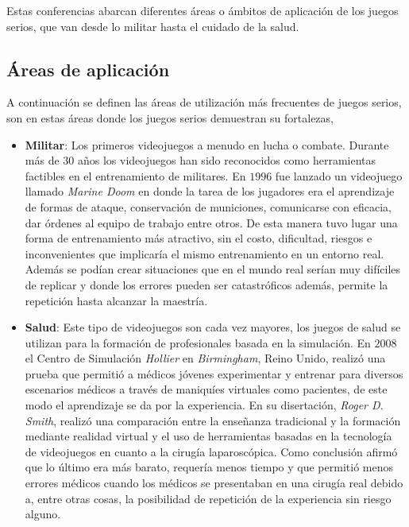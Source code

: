 Estas conferencias abarcan diferentes áreas o ámbitos de aplicación de los
juegos serios, que van desde lo militar hasta el cuidado de la salud.

\subsection{Áreas de aplicación}
\label{sec:areas_aplicacion}

A continuación se definen las áreas de utilización  más frecuentes de juegos serios, son en 
estas áreas donde los juegos serios demuestran su fortalezas,

\begin{itemize}

\item \textbf{Militar}: Los primeros videojuegos a menudo 
    en lucha o combate. Durante más de $30$ años los videojuegos han sido
    reconocidos como herramientas factibles en el entrenamiento de militares. En
    $1996$ fue lanzado un videojuego llamado \emph{Marine Doom} en donde la
    tarea de los jugadores era el aprendizaje de formas de ataque, conservación
    de municiones, comunicarse con eficacia, dar órdenes al equipo de trabajo
    entre otros. De esta manera tuvo lugar una forma de entrenamiento más
    atractivo, sin el costo, dificultad, riesgos e inconvenientes que implicaría
    el mismo entrenamiento en un entorno real. Además se podían crear
    situaciones que en el mundo real serían muy difíciles de replicar y donde
    los errores pueden ser catastróficos además, permite la repetición hasta
    alcanzar la maestría\cite{education:games}.

\item \textbf{Salud}: Este tipo de videojuegos son cada vez mayores, los juegos
    de salud se utilizan para la formación de profesionales basada en la
    simulación. En $2008$ el Centro de Simulación \emph{Hollier} en
    \emph{Birmingham}, Reino Unido, realizó una prueba que permitió a médicos
    jóvenes experimentar y entrenar para diversos escenarios médicos a través de
    maniquíes virtuales como pacientes, de este modo el aprendizaje se da por la
    experiencia. En su disertación, \emph{Roger D. Smith}, realizó una comparación
    entre la enseñanza tradicional y la formación mediante realidad virtual y el
    uso de herramientas basadas en la tecnología de videojuegos en cuanto a la
    cirugía laparoscópica. Como conclusión afirmó que lo último era más barato,
    requería menos tiempo y que permitió menos errores médicos cuando los
    médicos se presentaban en una cirugía real debido a, entre otras cosas, la
    posibilidad de repetición de la experiencia sin riesgo
    alguno\cite{education:games}. 


\end{itemize}
